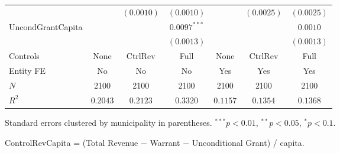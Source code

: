\begin{table}[H]
\begin{minipage}{\textwidth}
\begin{tabular}{lcccccc}
         &  & $(0.0010)$ & $(0.0010)$ &  & $(0.0025)$ & $(0.0025)$ \\[4pt]
        UncondGrantCapita &  &  & $0.0097^{***}$ &  &  & $0.0010$ \\
         &  &  & $(0.0013)$ &  &  & $(0.0013)$ \\[4pt]
        \midrule
        Controls & None & CtrlRev & Full & None & CtrlRev & Full \\
        Entity FE & No & No & No & Yes & Yes & Yes \\
        $N$ & 2100 & 2100 & 2100 & 2100 & 2100 & 2100 \\
        $R^2$ & $0.2043$ & $0.2123$ & $0.3320$ & $0.1157$ & $0.1354$ & $0.1368$ \\
        \bottomrule
    \end{tabular}

    \vspace{6pt}
    {\scriptsize Standard errors clustered by municipality in parentheses. $^{***}p<0.01$, $^{**}p<0.05$, $^{*}p<0.1$.}

    {\scriptsize ControlRevCapita = (Total Revenue $-$ Warrant $-$ Unconditional Grant) / capita.}
    \end{minipage}
\end{table}